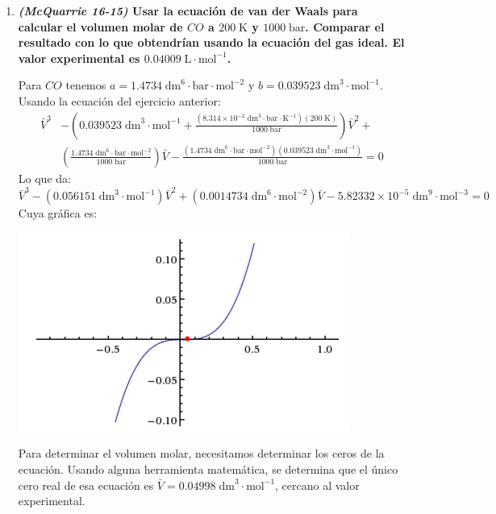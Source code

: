 \documentclass[a4paper,12pt]{article}
\begin{document}
\begin{enumerate}
 \item \textbf{\textit{(McQuarrie 16-15)} Usar la ecuaci\'on de van der Waals para calcular el volumen molar de $CO$ a $200\;\mbox{K}$ y $1000\;\mbox{bar}$. Comparar el resultado con lo que obtendr\'ian usando la ecuaci\'on del gas ideal. El valor experimental es $0.04009\;\mbox{L}\cdot\mbox{mol}^{-1}$.} %

Para $CO$ tenemos $a=1.4734\;\mbox{dm}^6\cdot\mbox{bar}\cdot\mbox{mol}^{-2}$ y $b=0.039523\;\mbox{dm}^3\cdot\mbox{mol}^{-1}$. Usando la ecuaci\'on del ejercicio anterior:
\begin{align*}
\bar{V}^3 &-\left(0.039523\;\mbox{dm}^3\cdot\mbox{mol}^{-1}+\frac{(8.314\times 10^{-2}\;\mbox{dm}^3\cdot\mbox{bar}\cdot\mbox{K}^{-1})(200\;\mbox{K})}{1000\;\mbox{bar}}\right)\bar{V}^2+ \\
& \left(\frac{1.4734\;\mbox{dm}^6\cdot\mbox{bar}\cdot\mbox{mol}^{-2}}{1000\;\mbox{bar}}\right)\bar{V}-\frac{(1.4734\;\mbox{dm}^6\cdot\mbox{bar}\cdot\mbox{mol}^{-2})(0.039523\;\mbox{dm}^3\cdot\mbox{mol}^{-1})}{1000\;\mbox{bar}}=0
\end{align*}
Lo que da:
$$\bar{V}^3-(0.056151\;\mbox{dm}^3\cdot\mbox{mol}^{-1})\bar{V}^2+(0.0014734\;\mbox{dm}^6\cdot\mbox{mol}^{-2})\bar{V}-5.82332\times10^{-5}\;\mbox{dm}^9\cdot\mbox{mol}^{-3}=0$$
Cuya gr\'afica es:
\begin{center}
 \includegraphics[scale=0.7]{figure2}
\end{center}
Para determinar el volumen molar, necesitamos determinar los ceros de la ecuaci\'on. Usando alguna herramienta matem\'atica, se determina que el \'unico cero real de esa ecuaci\'on es $\bar{V}=0.04998\;\mbox{dm}^3\cdot\mbox{mol}^{-1}$, cercano al valor experimental.

\end{enumerate}
 
\end{document}
